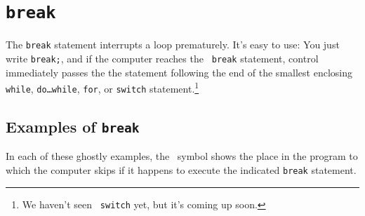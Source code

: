 \section{{\tt break}}
\label{break}

The {\tt break} statement interrupts a loop prematurely.  It's easy to
use: You just write {\tt break;}, and if the computer reaches the {\tt
break} statement, control immediately passes the the statement following
the end of the smallest enclosing {\tt while}, {\tt do{\rm\ldots}while},
{\tt for}, or {\tt switch} statement.\footnote{We haven't seen {\tt
switch} yet, but it's coming up soon.}

\subsection{Examples of {\tt break}}

In each of these ghostly examples, the \breakhere\ symbol shows the
place in the program to which the computer skips if it happens to
execute the indicated {\tt break} statement.
 
\begin{flushleft}
\verb% while ( . . . ) { % \\*
\verb%     . . . % \\*
\verb%     if ( . . . ) % \\*
\verb%       break ; % \\*
\verb%     . . . % \\*
\verb% } % \\*
\breakhere
\end{flushleft}


\begin{flushleft}
\verb% while ( . . . ) { % \\*
\verb%     for ( . . . ) { % \\*
\verb%         . . . % \\*
\verb%         if ( . . . ) % \\*
\verb%             break ; % \\*
\verb%         . . . % \\*
\verb%     } % \\*
\verb%    % \breakhere \\*
\verb%     . . .  % \\*
\verb% } % \\*
\end{flushleft}


\begin{flushleft}
\verb% do { % \\*
\verb%     . . . % \\*
\verb%     if ( . . . ) % \\*
\verb%         if ( . . . ) % \\*
\verb%             break ; % \\*
\verb%     . . . % \\*
\verb% } while ( . . . ) ; % \\*
\breakhere
\end{flushleft}

